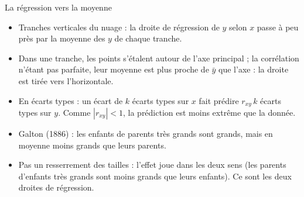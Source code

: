 \begin{frame}{La régression vers la moyenne}
  \begin{itemize}
    \item Tranches verticales du nuage : la droite de régression de $y$
      selon $x$ passe à peu près par la moyenne des $y$ de chaque tranche.
    \item Dans une tranche, les points s'étalent autour de l'axe principal ;
      la corrélation n'étant pas parfaite, leur moyenne est plus proche de
      $\bar y$ que l'axe : la droite est tirée vers l'horizontale.
    \item En écarts types : un écart de $k$ écarts types sur $x$ fait
      prédire $r_{xy}\,k$ écarts types sur $y$. Comme $|r_{xy}|<1$, la
      prédiction est moins extrême que la donnée.
    \item Galton (1886) : les enfants de parents très grands sont grands,
      mais en moyenne moins grands que leurs parents.
    \item Pas un resserrement des tailles : l'effet joue dans les deux sens
      (les parents d'enfants très grands sont moins grands que leurs
      enfants). Ce sont les deux droites de régression.
  \end{itemize}
\end{frame}
